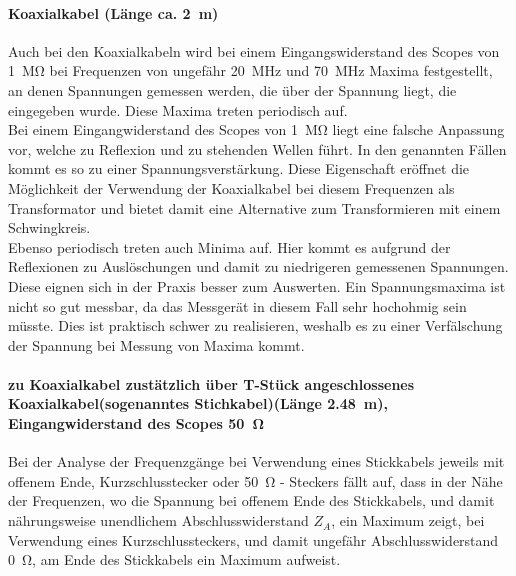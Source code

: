 \documentclass[a4paper,twoside,final]{article}
\begin{document}
\paragraph{Koaxialkabel (Länge ca. \SI{2}{\meter})}
Auch bei den Koaxialkabeln wird bei einem Eingangswiderstand des Scopes von \SI{1}{\mega\ohm} bei Frequenzen von ungefähr \SI{20}{\mega\hertz} und \SI{70}{\mega\hertz} Maxima festgestellt, an denen Spannungen gemessen werden, die über der Spannung liegt, die eingegeben wurde. Diese Maxima treten periodisch auf.\\
Bei einem Eingangwiderstand des Scopes von \SI{1}{\mega\ohm} liegt eine falsche Anpassung vor, welche zu Reflexion und zu stehenden Wellen führt. In den genannten Fällen kommt es so zu einer Spannungsverstärkung. Diese Eigenschaft eröffnet die Möglichkeit der Verwendung der Koaxialkabel bei diesem Frequenzen als Transformator und bietet damit eine Alternative zum Transformieren mit einem Schwingkreis.\\
Ebenso periodisch treten auch Minima auf. Hier kommt es aufgrund der Reflexionen zu Auslöschungen und damit zu niedrigeren gemessenen Spannungen. Diese eignen sich in der Praxis besser zum Auswerten. Ein Spannungsmaxima ist nicht so gut messbar, da das Messgerät in diesem Fall sehr hochohmig sein müsste. Dies ist praktisch schwer zu realisieren, weshalb es zu einer Verfälschung der Spannung bei Messung von Maxima kommt.

\paragraph{zu Koaxialkabel zustätzlich über T-Stück angeschlossenes Koaxialkabel(sogenanntes Stichkabel)(Länge \SI{2,48}{\meter}), Eingangwiderstand des Scopes \SI{50}{\ohm}}
Bei der Analyse der Frequenzgänge bei Verwendung eines Stickkabels jeweils mit offenem Ende, Kurzschlusstecker oder \SI{50}{\ohm} - Steckers fällt auf, dass in der Nähe der Frequenzen, wo die Spannung bei offenem Ende des Stickkabels, und damit nährungsweise unendlichem Abschlusswiderstand $Z_A$, ein Maximum zeigt, bei Verwendung eines Kurzschlussteckers, und damit ungefähr Abschlusswiderstand \SI{0}{\ohm}, am Ende des Stickkabels ein Maximum aufweist. \\
\end{document}
